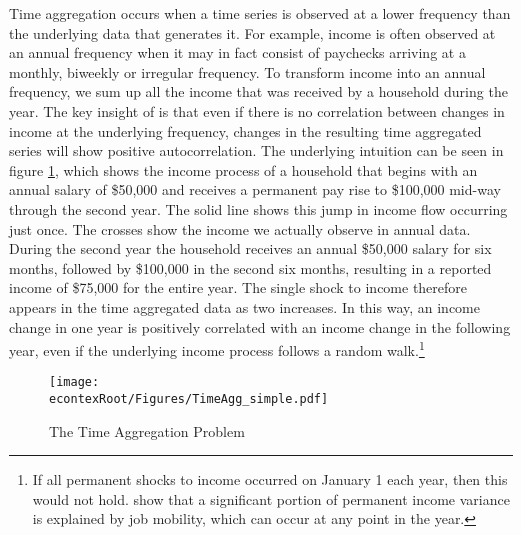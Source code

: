 \documentclass[titlepage]{\econtex}\newcommand{\texname}{ConsumptionHeterogeneity}
\begin{document}
Time aggregation occurs when a time series is observed at a lower frequency than the underlying data that generates it. For example, income is often observed at an annual frequency when it may in fact consist of paychecks arriving at a monthly, biweekly or irregular frequency. To transform income into an annual frequency, we sum up all the income that was received by a household during the year. The key insight of \cite{working_note_1960} is that even if there is no correlation between changes in income at the underlying frequency, changes in the resulting time aggregated series will show positive autocorrelation. The underlying intuition can be seen in figure \ref{fig:TimeAgg}, which shows the income process of a household that begins with an annual salary of \$50,000 and receives a permanent pay rise to \$100,000 mid-way through the second year. The solid line shows this jump in income flow occurring just once. The crosses show the income we actually observe in annual data. During the second year the household receives an annual \$50,000 salary for six months, followed by \$100,000 in the second six months, resulting in a reported income of \$75,000 for the entire year. The single shock to income therefore appears in the time aggregated data as two increases. In this way, an income change in one year is positively correlated with an income change in the following year, even if the underlying income process follows a random walk.\footnote{If all permanent shocks to income occurred on January 1 each year, then this would not hold. \cite{low_wage_2010} show that a significant portion of permanent income variance is explained by job mobility, which can occur at any point in the year.}
\begin{figure} 
	\begin{centering}
		\texttt{[image: \\econtexRoot/Figures/TimeAgg\_simple.pdf]} 
		\caption{The Time Aggregation Problem}
		\label{fig:TimeAgg}
	\end{centering}
\end{figure}
\end{document}
